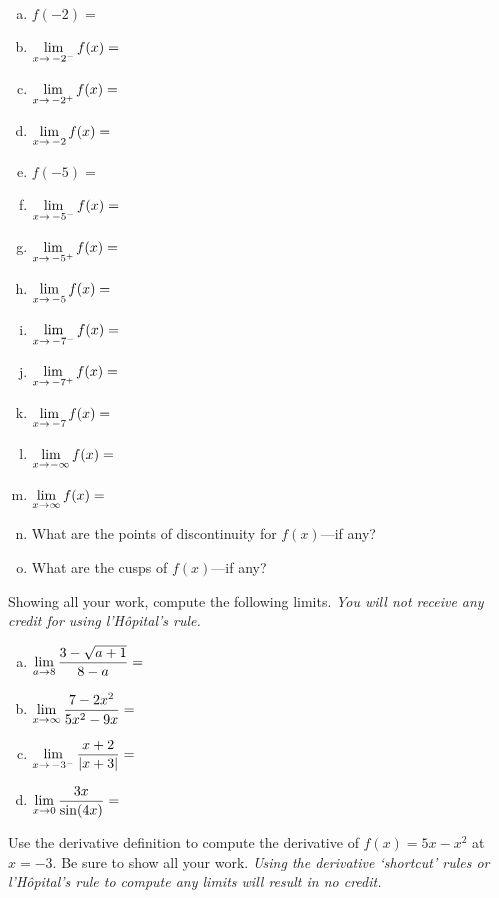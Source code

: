 \documentclass[12pt,letterpaper]{exam}
\begin{document}
\begin{questions}
\begin{enumerate}[(a)]
\item $f(-2)=$ \vfill
\item $\displaystyle\lim_{x \to \,-2^-} f(x)=$ \vfill
\item $\displaystyle\lim_{x \to \,-2^+} f(x)=$ \vfill
\item $\displaystyle\lim_{x \to \,-2} f(x)=$ \vfill
\item $f(-5)=$ \vfill
\item $\displaystyle\lim_{x \to \,-5^-} f(x)=$ \vfill
\item $\displaystyle\lim_{x \to \,-5^+} f(x)=$ \vfill
\item $\displaystyle\lim_{x \to \,-5} f(x)=$ \vfill
\item $\displaystyle\lim_{x \to \,-7^-} f(x)=$ \vfill
\item $\displaystyle\lim_{x \to \,-7^+} f(x)=$ \vfill
\item $\displaystyle\lim_{x \to \,-7} f(x)=$ \vfill
\item $\displaystyle\lim_{x \to -\infty} f(x)=$ \vfill
\item $\displaystyle\lim_{x \to \infty} f(x)=$ \vfill
\item What are the points of discontinuity for $f(x)$---if any? \vfill
\item What are the cusps of $f(x)$---if any? \vfill
\end{enumerate}



\newpage
\question[20] Showing all your work, compute the following limits. {\itshape You will not receive any credit for using l'H\^opital's rule.} \par\vspace{0.3cm}
	\begin{enumerate}[(a)]
	\item $\displaystyle\lim_{a \to 8} \dfrac{3 - \sqrt{a + 1}}{8 - a}=$ \vfill
	\item $\displaystyle\lim_{x \to \infty} \dfrac{7 - 2x^2}{5x^2 - 9x}=$ \vfill
	
	\newpage
	
	
	\item $\displaystyle\lim_{x \to \,-3^-} \dfrac{x + 2}{|x + 3|}=$ \vfill
	\item $\displaystyle\lim_{x \to 0} \dfrac{3x}{\sin(4x)}=$ \vfill
	\end{enumerate}



\newpage
\question[20] Use the derivative definition to compute the derivative of $f(x)= 5x - x^2$ at $x= -3$. Be sure to show all your work. {\itshape Using the derivative `shortcut' rules or l'H\^opital's rule to compute any limits will result in no credit.}




\end{questions}
\end{document}
